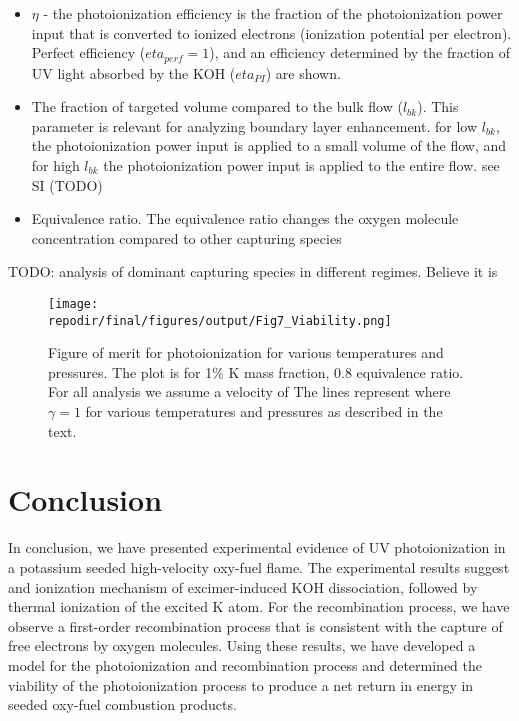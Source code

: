 \begin{itemize}
    \item $\eta$ - the photoionization efficiency is the fraction of the photoionization power input that is converted to ionized electrons (ionization potential per electron). Perfect efficiency ($eta_{perf} = 1$), and an efficiency determined by the fraction of UV light absorbed by the KOH ($eta_{PI}$) are shown.
    \item The fraction of targeted volume compared to the bulk flow ($l_{bk}$). This parameter is relevant for analyzing boundary layer enhancement. for low $l_{bk}$, the photoionization power input is applied to a small volume of the flow, and for high $l_{bk}$ the photoionization power input is applied to the entire flow. see SI (TODO)
    \item Equivalence ratio. The equivalence ratio changes the oxygen molecule concentration compared to other capturing species
\end{itemize}


TODO:  analysis of dominant capturing species in different regimes. Believe it is 


\begin{figure}[h]
    \centering
    \texttt{[image: \\repodir/final/figures/output/Fig7\_Viability.png]} 
    \caption{Figure of merit for photoionization for various temperatures and pressures. The plot is for 1\% K mass fraction, 0.8 equivalence ratio. For all analysis we assume a velocity of  The lines represent where $\gamma = 1$ for various temperatures and pressures as described in the text.}   
    \label{fig:viability_gamma}
\end{figure}



\section{Conclusion}

In conclusion, we have presented experimental evidence of UV photoionization in a potassium seeded high-velocity oxy-fuel flame. The experimental results suggest and ionization mechanism of excimer-induced KOH dissociation, followed by thermal ionization of the excited K atom. For the recombination process, we have observe a first-order recombination process that is consistent with the capture of free electrons by oxygen molecules. Using these results, we have developed a model for the photoionization and recombination process and determined the viability of the photoionization process to produce a net return in energy in seeded oxy-fuel combustion products. 